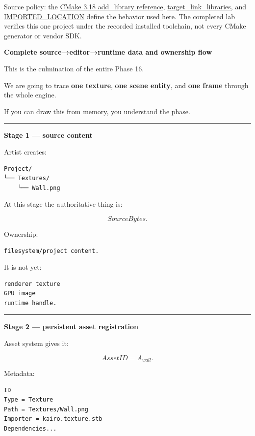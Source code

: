 Source policy: the \href{https://cmake.org/cmake/help/v3.18/command/add_library.html}{CMake 3.18 add\_library reference}, \href{https://cmake.org/cmake/help/v3.18/command/target_link_libraries.html}{target\_link\_libraries}, and \href{https://cmake.org/cmake/help/v3.18/prop_tgt/IMPORTED_LOCATION.html}{IMPORTED\_LOCATION} define the behavior used here. The completed lab verifies this one project under the recorded installed toolchain, not every CMake generator or vendor SDK.

\textbf{Complete source→editor→runtime data and ownership flow}

This is the culmination of the entire Phase 16.

We are going to trace \textbf{one texture}, \textbf{one scene entity}, and \textbf{one frame} through the whole engine.

If you can draw this from memory, you understand the phase.

\begin{center}\rule{0.5\linewidth}{0.5pt}\end{center}

\textbf{Stage 1 --- source content}

Artist creates:

\begin{verbatim}
Project/
└── Textures/
    └── Wall.png
\end{verbatim}

At this stage the authoritative thing is:

\[
SourceBytes.
\]

Ownership:

\begin{verbatim}
filesystem/project content.
\end{verbatim}

It is not yet:

\begin{verbatim}
renderer texture
GPU image
runtime handle.
\end{verbatim}

\begin{center}\rule{0.5\linewidth}{0.5pt}\end{center}

\textbf{Stage 2 --- persistent asset registration}

Asset system gives it:

\[
AssetID=A_{wall}.
\]

Metadata:

\begin{verbatim}
ID
Type = Texture
Path = Textures/Wall.png
Importer = kairo.texture.stb
Dependencies...
\end{verbatim}

